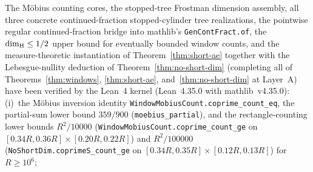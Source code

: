 \begin{remark}\label{rem:windows-lean}
The M\"obius counting cores, the stopped-tree Frostman dimension assembly, all three concrete continued-fraction stopped-cylinder tree realizations, the pointwise regular continued-fraction bridge into mathlib's \texttt{GenContFract.of}, the $\dim_{\mathrm{H}}\le1/2$ upper bound for eventually bounded window counts, and the measure-theoretic instantiation of Theorem~\ref{thm:short-ae} together with the Lebesgue-nullity deduction of Theorem~\ref{thm:no-short-dim} (completing all of Theorems~\ref{thm:windows}, \ref{thm:short-ae}, and~\ref{thm:no-short-dim} at Layer~A) have been verified by the Lean~4 kernel (Lean~4.35.0 with mathlib~v4.35.0):
(i)~the M\"obius inversion identity \texttt{WindowMobiusCount.\allowbreak coprime\_\allowbreak count\_\allowbreak eq}, the partial-sum lower bound $359/900$ (\texttt{moebius\_\allowbreak partial}), and the rectangle-counting lower bounds $R^2/10000$ (\texttt{WindowMobiusCount.\allowbreak coprime\_\allowbreak count\_\allowbreak ge} on $[0.34R,0.36R]\times[0.20R,0.22R]$) and $R^2/100000$ (\texttt{NoShortDim.\allowbreak coprimeS\_\allowbreak count\_\allowbreak ge} on $[0.34R,0.35R]\times[0.12R,0.13R]$) for $R\ge10^6$;

\end{remark}
